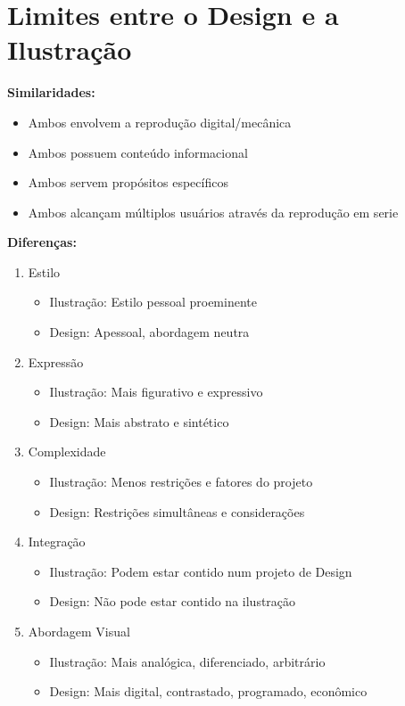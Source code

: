\documentclass{article}
\begin{document}
\newpage
\section{Limites entre o Design e a Ilustração}

\textbf{Similaridades:}
\begin{itemize}
    \item Ambos envolvem a reprodução digital/mecânica
    \item Ambos possuem conteúdo informacional
    \item Ambos servem propósitos específicos
    \item Ambos alcançam múltiplos usuários através da reprodução em serie
\end{itemize}

\textbf{Diferenças:}
\begin{enumerate}
    \item Estilo
    \begin{itemize}
        \item Ilustração: Estilo pessoal proeminente
        \item Design: Apessoal, abordagem neutra
    \end{itemize}
    \item Expressão
    \begin{itemize}
        \item Ilustração: Mais figurativo e expressivo
        \item Design: Mais abstrato e sintético
    \end{itemize}
    \item Complexidade
    \begin{itemize}
        \item Ilustração: Menos restrições e fatores do projeto
        \item Design: Restrições simultâneas e considerações
    \end{itemize}
    \item Integração
    \begin{itemize}
        \item Ilustração: Podem estar contido num projeto de Design
        \item Design: Não pode estar contido na ilustração
    \end{itemize}
    \item Abordagem Visual
    \begin{itemize}
        \item Ilustração: Mais analógica, diferenciado, arbitrário
        \item Design: Mais digital, contrastado, programado, econômico
    \end{itemize}
\end{enumerate}
\end{document}
